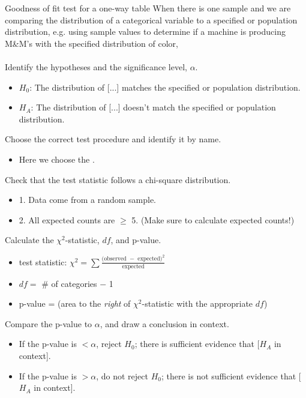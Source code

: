 \begin{onebox}{Goodness of fit test for a one-way table}
 When there is one sample and we are comparing the distribution of a categorical variable to a specified or population distribution, e.g. using sample values to determine if a machine is producing M\&M's with the specified distribution of color, 
\\
\\
 Identify the hypotheses and the significance level, $\alpha$. \vspace{-1mm}
\begin{itemize}
\setlength{\itemsep}{0mm}
\item[]  $H_0$: The distribution of [...] matches the specified or population distribution. 
\item[] $H_A$: The distribution of [...] doesn't match the specified or population distribution.
\end{itemize}
 Choose the correct test procedure and identify it by name.\vspace{-1mm}
\begin{itemize}
\item[]  Here we choose the .
\end{itemize}
 Check that the test statistic follows a chi-square distribution.\vspace{-1mm}
\begin{itemize}
\setlength{\itemsep}{0mm}
\item[] 1.  Data come from a random sample.
\item[] 2.  All expected counts are $\ge$ 5.  (Make sure to calculate expected counts!)
\end{itemize}
 Calculate the $\chi^2$-statistic, $df$, and p-value.\vspace{-1mm}  
\begin{itemize}
\setlength{\itemsep}{0mm}
\item[] test statistic:  $\chi^2 =\sum{ \frac{\text{(observed } - \text{ expected})^2}{\text{expected}}}$ 
\item[] $df =$ \# of categories $-$ 1
\item[] p-value = (area to the \emph{right} of $\chi^2$-statistic with the appropriate $df$)
\end{itemize}
 Compare the p-value to $\alpha$, and draw a conclusion in context.
\begin{itemize}\vspace{-1mm}
\setlength{\itemsep}{0mm}
\item[] If the p-value is $< \alpha$, reject $H_0$; there is sufficient evidence that [$H_A$ in context]. 
\item[] If the p-value is $> \alpha$, do not reject $H_0$; there is not sufficient evidence that [$H_A$ in context].
\end{itemize}
\end{onebox}


